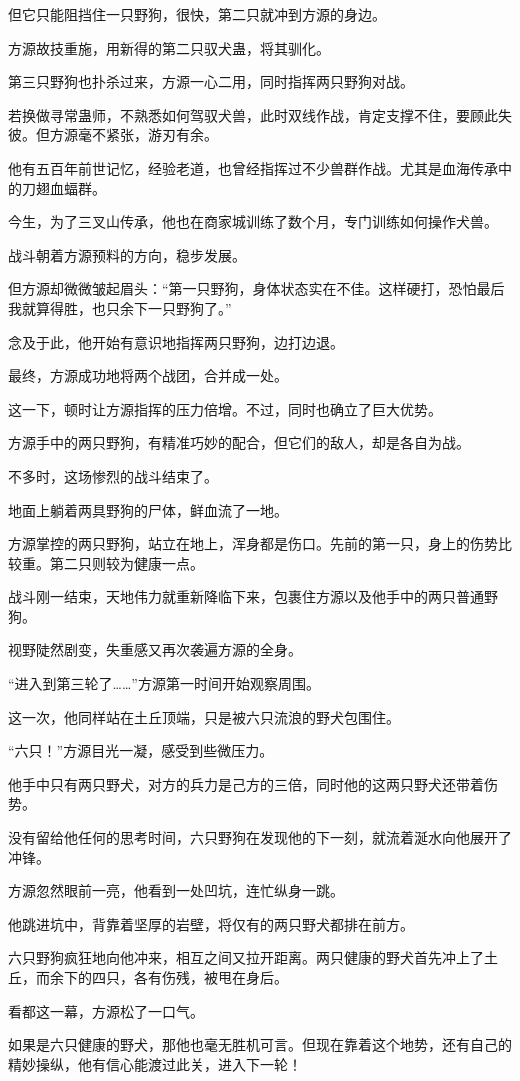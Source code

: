 \begin{this_body}
但它只能阻挡住一只野狗，很快，第二只就冲到方源的身边。

方源故技重施，用新得的第二只驭犬蛊，将其驯化。

第三只野狗也扑杀过来，方源一心二用，同时指挥两只野狗对战。

若换做寻常蛊师，不熟悉如何驾驭犬兽，此时双线作战，肯定支撑不住，要顾此失彼。但方源毫不紧张，游刃有余。

他有五百年前世记忆，经验老道，也曾经指挥过不少兽群作战。尤其是血海传承中的刀翅血蝠群。

今生，为了三叉山传承，他也在商家城训练了数个月，专门训练如何操作犬兽。

战斗朝着方源预料的方向，稳步发展。

但方源却微微皱起眉头：“第一只野狗，身体状态实在不佳。这样硬打，恐怕最后我就算得胜，也只余下一只野狗了。”

念及于此，他开始有意识地指挥两只野狗，边打边退。

最终，方源成功地将两个战团，合并成一处。

这一下，顿时让方源指挥的压力倍增。不过，同时也确立了巨大优势。

方源手中的两只野狗，有精准巧妙的配合，但它们的敌人，却是各自为战。

不多时，这场惨烈的战斗结束了。

地面上躺着两具野狗的尸体，鲜血流了一地。

方源掌控的两只野狗，站立在地上，浑身都是伤口。先前的第一只，身上的伤势比较重。第二只则较为健康一点。

战斗刚一结束，天地伟力就重新降临下来，包裹住方源以及他手中的两只普通野狗。

视野陡然剧变，失重感又再次袭遍方源的全身。

“进入到第三轮了……”方源第一时间开始观察周围。

这一次，他同样站在土丘顶端，只是被六只流浪的野犬包围住。

“六只！”方源目光一凝，感受到些微压力。

他手中只有两只野犬，对方的兵力是己方的三倍，同时他的这两只野犬还带着伤势。

没有留给他任何的思考时间，六只野狗在发现他的下一刻，就流着涎水向他展开了冲锋。

方源忽然眼前一亮，他看到一处凹坑，连忙纵身一跳。

他跳进坑中，背靠着坚厚的岩壁，将仅有的两只野犬都排在前方。

六只野狗疯狂地向他冲来，相互之间又拉开距离。两只健康的野犬首先冲上了土丘，而余下的四只，各有伤残，被甩在身后。

看都这一幕，方源松了一口气。

如果是六只健康的野犬，那他也毫无胜机可言。但现在靠着这个地势，还有自己的精妙操纵，他有信心能渡过此关，进入下一轮！

\end{this_body}

